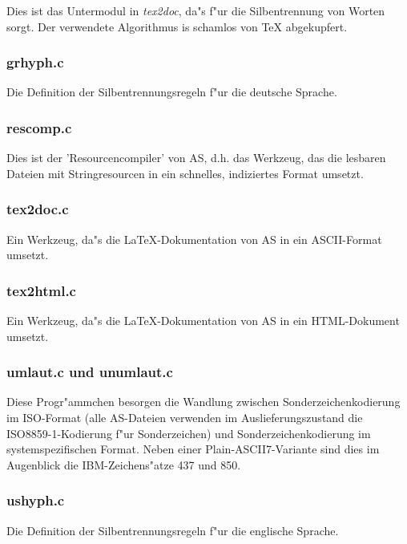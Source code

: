 \documentclass[12pt,a4paper,twoside]{report}
\begin{document}
{Dies ist das Untermodul in {\em tex2doc}, da"s f"ur die Silbentrennung von
Worten sorgt.  Der verwendete Algorithmus is schamlos von TeX
abgekupfert.

\subsubsection{grhyph.c}

Die Definition der Silbentrennungsregeln f"ur die deutsche Sprache.

\subsubsection{rescomp.c}

Dies ist der 'Resourcencompiler' von AS, d.h. das Werkzeug, das die
lesbaren Dateien mit Stringresourcen in ein schnelles, indiziertes Format
umsetzt.

\subsubsection{tex2doc.c}

Ein Werkzeug, da"s die LaTeX-Dokumentation von AS in ein ASCII-Format
umsetzt.

\subsubsection{tex2html.c}

Ein Werkzeug, da"s die LaTeX-Dokumentation von AS in ein HTML-Dokument
umsetzt.

\subsubsection{umlaut.c und unumlaut.c}

Diese Progr"ammchen besorgen die Wandlung zwischen Sonderzeichenkodierung
im ISO-Format (alle AS-Dateien verwenden im Auslieferungszustand die
ISO8859-1-Kodierung f"ur Sonderzeichen) und Sonderzeichenkodierung im
systemspezifischen Format.  Neben einer Plain-ASCII7-Variante sind dies im
Augenblick die IBM-Zeichens"atze 437 und 850.

\subsubsection{ushyph.c}

Die Definition der Silbentrennungsregeln f"ur die englische Sprache.


}
\end{document}
